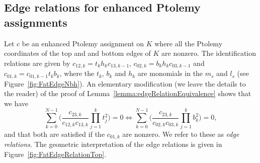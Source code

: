 \documentclass[11pt]{amsart}
\theoremstyle{plain}
\theoremstyle{definition}
\numberwithin{equation}{section}
\begin{document}
\subsection{Edge relations for enhanced Ptolemy assignments}
Let $c$ be an enhanced Ptolemy assignment on $K$ where all the Ptolemy coordinates of the top and and bottom edges of $K$ are nonzero.
The identification relations are given by $c_{12,k}=t_kh_kc_{13,k-1}$, $c_{02,k}=b_kh_kc_{03,k-1}$ and $c_{01,k}=c_{01,k-1}t_kb_k$, where the $t_k$, $b_k$ and $h_k$ are monomials in the $m_s$ and $l_s$ (see Figure~\ref{fig:FatEdgeNbh}). An elementary modification (we leave the details to the reader) of the proof of Lemma~\ref{lemma:edgeRelationEquivalence} shows that we have  
\begin{equation}\label{eq:EdgeEquationsEnhanced}
\sum_{k=0}^{N-1}\Big(\frac{c_{23,k}}{c_{12,k}c_{13,k}}\prod_{j=1}^k t_j^2\Big)=0\iff\sum_{k=0}^{N-1}\Big(\frac{c_{23,k}}{c_{02,k}c_{03,k}}\prod_{j=1}^k b_k^2\Big)=0,
\end{equation}
and that both are satisfied if the $c_{01,k}$ are nonzero. We refer to these as \emph{edge relations}. The geometric interpretation of the edge relations is given in Figure~\ref{fig:FatEdgeRelationTop}.







\end{document}
